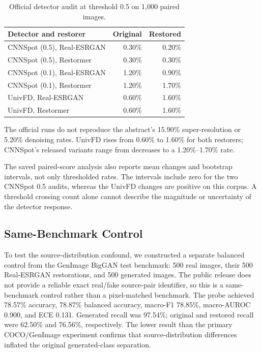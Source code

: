 ﻿\documentclass[graybox,norunningheads]{svmult}
\begin{document}
\begin{table}[t]
\centering
\caption{Official detector audit at threshold 0.5 on 1,000 paired images.}
\label{tab:official}
\begin{tabular}{@{}lrr@{}}
\toprule
Detector and restorer & Original & Restored \\
\midrule
CNNSpot (0.5), Real-ESRGAN & 0.30\% & 0.20\% \\
CNNSpot (0.5), Restormer & 0.30\% & 0.30\% \\
CNNSpot (0.1), Real-ESRGAN & 1.20\% & 0.90\% \\
CNNSpot (0.1), Restormer & 1.20\% & 1.70\% \\
UnivFD, Real-ESRGAN & 0.60\% & 1.60\% \\
UnivFD, Restormer & 0.60\% & 1.60\% \\
\bottomrule
\end{tabular}
\end{table}

The official runs do not reproduce the abstract's 15.90\% super-resolution or
5.20\% denoising rates. UnivFD rises from 0.60\% to 1.60\% for both restorers;
CNNSpot's released variants range from decreases to a 1.20\%--1.70\% rate.

The saved paired-score analysis also reports mean changes and bootstrap intervals,
not only thresholded rates. The intervals include zero for the two CNNSpot 0.5
audits, whereas the UnivFD changes are positive on this corpus. A threshold
crossing count alone cannot describe the magnitude or uncertainty of the detector
response.





\subsection{Same-Benchmark Control}

To test the source-distribution confound, we constructed a separate balanced
control from the GenImage BigGAN test benchmark: 500 real images, their 500
Real-ESRGAN restorations, and 500 generated images. The public release does not
provide a reliable exact real/fake source-pair identifier, so this is a
same-benchmark control rather than a pixel-matched benchmark. The probe achieved
78.57\% accuracy, 78.87\% balanced accuracy, macro-F1 78.85\%, macro-AUROC
0.900, and ECE 0.131. Generated recall was 97.54\%; original and restored recall
were 62.50\% and 76.56\%, respectively. The lower result than the primary
COCO/GenImage experiment confirms that source-distribution differences inflated
the original generated-class separation.
\end{document}
